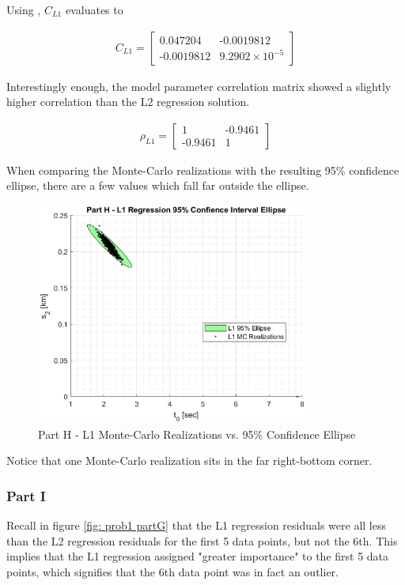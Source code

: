Using \MATLAB, $C_{L1}$ evaluates to

\begin{align*}
	C_{L1} = \begin{bmatrix} \textrm{0.047204} & \textrm{-0.0019812} \\ \textrm{-0.0019812} & \textrm{9.2902} \times 10^{-5} \end{bmatrix}
\end{align*}

Interestingly enough, the model parameter correlation matrix showed a slightly higher correlation than the L2 regression solution. 

\begin{align*}
	\rho_{L1} = \begin{bmatrix} \textrm{1} & \textrm{-0.9461} \\ \textrm{-0.9461} & \textrm{1} \end{bmatrix}
\end{align*}

When comparing the Monte-Carlo realizations with the resulting 95\% confidence ellipse, there are a few values which fall far outside the ellipse. 

 \begin{figure}[h] 
 	\centering
 	\includegraphics[width=0.8\textwidth]{./images/prob1_partH.eps}
 	\caption{Part H - L1 Monte-Carlo Realizations vs. 95\% Confidence Ellipse}
 	\label{fig: prob1 partH}
 \end{figure}
 \FloatBarrier
 
 Notice that one Monte-Carlo realization sits in the far right-bottom corner.

\subsubsection{Part I}

Recall in figure \ref{fig: prob1 partG} that the L1 regression residuals were all less than the L2 regression residuals for the first 5 data points, but not the 6th. This implies that the L1 regression assigned "greater importance" to the first 5 data points, which signifies that the 6th data point was in fact an outlier. 

